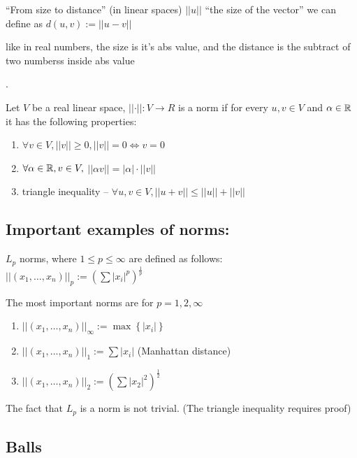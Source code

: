 ``From size to distance'' (in linear spaces) $\left|\left|u\right|\right|$
``the size of the vector'' we can define as $d\left(u,v\right):=\left|\left|u-v\right|\right|$%
\begin{insight}
like in real numbers, the size is it's abs value, and the distance
is the subtract of two numberss inside abs value%
\end{insight}
.
\begin{definition}
Let $V$ be a real linear space, $\left|\left|\cdot\right|\right|:V\to R$
is a norm if for every $u,v\in V$ and $\alpha\in\mathbb{R}$ it has the following
properties:
\begin{enumerate}
\item $\forall v\in V,\left|\left|v\right|\right|\ge0,\left|\left|v\right|\right|=0\iff v=0$
\item $\forall\alpha\in\mathbb{R},v\in V,$ $\left|\left|\alpha v\right|\right|=\left|\alpha\right|\cdot\left|\left|v\right|\right|$
\item triangle inequality -- $\forall u,v\in V,\left|\left|u+v\right|\right|\le\left|\left|u\right|\right|+\left|\left|v\right|\right|$
\end{enumerate}
\end{definition}


\subsection{Important examples of norms:}

$L_{p}$ norms, where $1\le p\le\infty$ are defined as follows: $\left|\left|\left(x_{1},\dots,x_{n}\right)\right|\right|_{p}:=\left(\sum\left|x_{i}\right|^{p}\right)^{\frac{1}{p}}$

The most important norms are for $p=1,2,\infty$
\begin{enumerate}
\item $\left|\left|\left(x_{1},\dots,x_{n}\right)\right|\right|_{\infty}:=\max\left\{ \left|x_{i}\right|\right\} $
\item $\left|\left|\left(x_{1},\dots,x_{n}\right)\right|\right|_{1}:=\sum\left|x_{i}\right|$
(Manhattan distance)
\item $\left|\left|\left(x_{1},\dots,x_{n}\right)\right|\right|_{2}:=\left(\sum\left|x_{2}\right|^{2}\right)^{\frac{1}{2}}$
\end{enumerate}
The fact that $L_{p}$ is a norm is not trivial. (The triangle inequality
requires proof)

\subsection{Balls}

